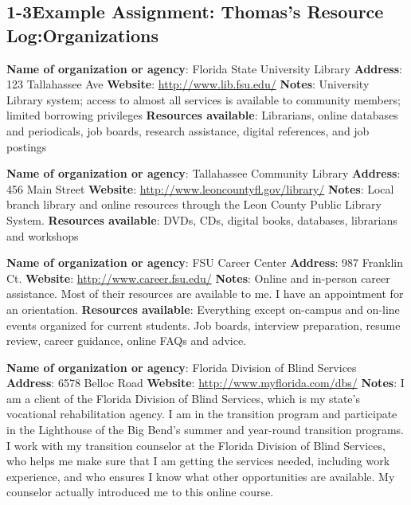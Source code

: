 \pagebreak \subsection*{1-3\quad Example Assignment: Thomas's Resource Log:Organizations}
\textbf{Name of organization or agency}: Florida State University Library 
\break \textbf{Address}: 123 Tallahassee Ave
\break \textbf{Website}: \href{http://www.lib.fsu.edu/}{http://www.lib.fsu.edu/}
\break \textbf{Notes}: University Library system; access to almost all services is available to community members; limited borrowing privileges
\break \textbf{Resources available}: Librarians, online databases and periodicals, job boards, research assistance, digital references, and job postings

\textbf{Name of organization or agency}: Tallahassee Community Library 
\break \textbf{Address}: 456 Main Street
\break \textbf{Website}: \href{http://www.leoncountyfl.gov/library/}{http://www.leoncountyfl.gov/library/}
\break \textbf{Notes}: Local branch library and online resources through the Leon County Public Library System. 
\break \textbf{Resources available}: DVDs, CDs, digital books, databases, librarians and workshops

\textbf{Name of organization or agency}: FSU Career Center 
\break \textbf{Address}: 987 Franklin Ct.
\break \textbf{Website}: \href{http://www.career.fsu.edu/}{http://www.career.fsu.edu/}
\break \textbf{Notes}: Online and in-person career assistance. Most of their resources are available to me. I have an appointment for an orientation.
\break \textbf{Resources available}: Everything except on-campus and on-line events organized for current students. Job boards, interview preparation, resume review, career guidance, online FAQs and advice.

\textbf{Name of organization or agency}: Florida Division of Blind Services
\break \textbf{Address}: 6578 Belloc Road
\break \textbf{Website}: \href{http://www.myflorida.com/dbs/}{http://www.myflorida.com/dbs/}
\break \textbf{Notes}: I am a client of the Florida Division of Blind Services, which is my state's vocational rehabilitation agency. I am in the transition program and participate in the Lighthouse of the Big Bend's summer and year-round transition programs. I work with my transition counselor at the Florida Division of Blind Services, who helps me make sure that I am getting the services needed, including work experience, and who ensures I know what other opportunities are available. My counselor actually introduced me to this online course.

